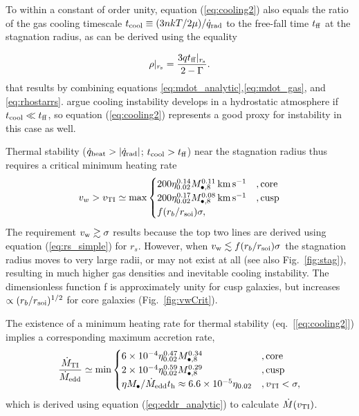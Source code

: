 \documentclass[usenatbib,fleqn]{mn2e}
\newcommand{\tff}{t_{\rm ff}}
\begin{document}
To within a constant of order unity, equation (\ref{eq:cooling2}) also
equals the ratio of the gas cooling timescale $t_{\rm cool} \equiv (3n
kT/2 \mu)/\dot{q}_{\rm rad}$ to the free-fall time $t_{\rm ff}$ at the
stagnation radius, as can be derived using the equality

\begin{align}
\rho|_{r_{\rm s}}=\frac{3 q\tff|_{r_{\rm s}}}{2-\Gamma}.
\label{eq:rhors2}
\end{align}
that results by combining equations
\eqref{eq:mdot_analytic},\eqref{eq:mdot_gas}, and
\eqref{eq:rhostarrs}.  \citet{McCourt+12} argue cooling instability
develops in a hydrostatic atmosphere if $t_{\rm cool} \ll t_{\rm ff}$,
so equation (\ref{eq:cooling2}) represents a good proxy for
instability in this case as well.

Thermal stability ($\dot{q}_{\rm heat} > |\dot{q}_{\rm rad}|$; $t_{\rm
  cool} > t_{\rm ff}$) near the stagnation radius thus requires a
critical minimum heating rate
\begin{align}
v_{w} > v_{\rm TI} \simeq
  {\rm max}\begin{cases}
   200 \eta_{0.02}^{0.14} M_{\bullet,8}^{0.11}\,{\rm km\,s^{-1}}  &, \text{core}\\
   200 \eta_{0.02}^{0.17} M_{\bullet,8}^{0.08}\,{\rm km\,s^{-1}}   &, \text{cusp}\\
f(r_b/r_{\rm soi})\sigma,     
  \end{cases}
  \label{eq:cooling3}
\end{align}
The requirement $v_{\rm w} \gtrsim \sigma$ results because the top two
lines are derived using equation (\ref{eq:rs_simple}) for $r_s$.
However, when $v_{\rm w} \lesssim f(r_b/r_{\rm soi})\sigma$ the
stagnation radius moves to very large radii, or may not exist at all
(see also Fig.~\ref{fig:stag}), resulting in much higher gas densities
and inevitable cooling instability.  The dimensionless function f is
approximately unity for cusp galaxies, but increases $\propto
(r_b/r_{\rm soi})^{1/2}$ for core galaxies (Fig.~\ref{fig:vwCrit}).  

The existence of a minimum heating rate for thermal stability (eq.~[\ref{eq:cooling2}]) implies a corresponding maximum accretion rate,
\begin{align}
\frac{\dot{M}_{\rm TI}}{\dot{M}_{\rm edd}} \simeq
  {\rm min}\begin{cases}
   6\times 10^{-4} \eta_{0.02}^{0.47} M_{\bullet,8}^{0.34} &, \text{core}\\
   2\times 10^{-4} \eta_{0.02}^{0.59} M_{\bullet,8}^{0.29}    &, \text{cusp}\\
\eta M_{\bullet}/\dot{M}_{\rm edd}t_{\rm h} \approx 6. 6\times 10^{-5}\eta_{0.02}&, v_{\rm TI} < \sigma,
  \end{cases}
  \label{eq:Mdotmax}
\end{align}
which is derived using equation (\ref{eq:eddr_analytic}) to calculate $\dot{M}(v_{\rm TI})$.
\end{document}
